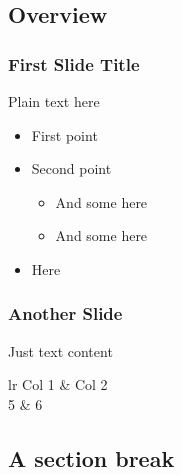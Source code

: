 \hypertarget{overview}{%
\subsection{Overview}\label{overview}}

\hypertarget{first-slide-title}{%
\subsubsection{First Slide Title}\label{first-slide-title}}

Plain text here

\begin{itemize}
\tightlist
\item
  First point
\item
  Second point

  \begin{itemize}
  \tightlist
  \item
    And some here
  \item
    And some here
  \end{itemize}
\item
  Here
\end{itemize}

\hypertarget{another-slide}{%
\subsubsection{Another Slide}\label{another-slide}}

Just text content

\begin{table}{lr}
Col 1 & Col 2\\
5 & 6
\end{table}

\hypertarget{a-section-break}{%
\subsection{A section break}\label{a-section-break}}
